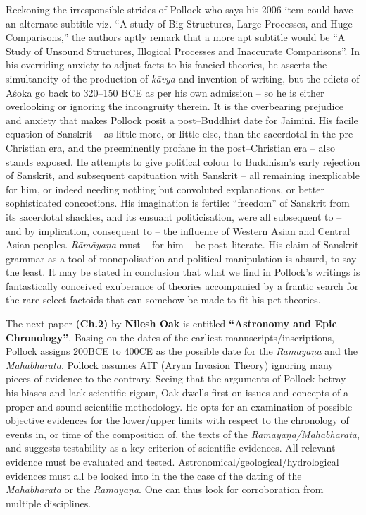 Reckoning the irresponsible strides of Pollock who says his 2006 item could have an alternate subtitle viz. “A study of Big Structures, Large Processes, and Huge Comparisons,” the authors aptly remark that a more apt subtitle would be “\underline{A Study of Unsound Structures, Illogical Processes and Inaccurate Comparisons}”. In his overriding anxiety to adjust facts to his fancied theories, he asserts the simultaneity of the production of \textit{kāvya} and invention of writing, but the edicts of Aśoka go back to 320–150 BCE as per his own admission – so he is either overlooking or ignoring the incongruity therein. It is the overbearing prejudice and anxiety that makes Pollock posit a post–Buddhist date for Jaimini. His facile equation of Sanskrit – as little more, or little else, than the sacerdotal in the pre–Christian era, and the preeminently profane in the post–Christian era – also stands exposed. He attempts to give political colour to Buddhism’s early rejection of Sanskrit, and subsequent capituation with Sanskrit – all remaining inexplicable for him, or indeed needing nothing but convoluted explanations, or better sophisticated concoctions. His imagination is fertile: “freedom” of Sanskrit from its sacerdotal shackles, and its ensuant politicisation, were all subsequent to – and by implication, consequent to – the influence of Western Asian and Central Asian peoples. \textit{Rāmāyaṇa} must – for him – be post–literate. His claim of Sanskrit grammar as a tool of monopolisation and political manipulation is absurd, to say the least. It may be stated in conclusion that what we find in Pollock’s writings is fantastically conceived exuberance of theories accompanied by a frantic search for the rare select factoids that can somehow be made to fit his pet theories.

The next paper \textbf{(Ch.2)} by \textbf{Nilesh Oak} is entitled \textbf{“Astronomy and Epic Chronology”}. Basing on the dates of the earliest manuscripts/inscriptions, Pollock assigns 200BCE to 400CE as the possible date for the \textit{Rāmāyaṇa} and the \textit{Mahābhārata}. Pollock assumes AIT (Aryan Invasion Theory) ignoring many pieces of evidence to the contrary. Seeing that the arguments of Pollock betray his biases and lack scientific rigour, Oak dwells first on issues and concepts of a proper and sound scientific methodology. He opts for an examination of possible objective evidences for the lower/upper limits with respect to the chronology of events in, or time of the composition of, the texts of the \textit{Rāmāyaṇa/Mahābhārata}, and suggests testability as a key criterion of scientific evidences. All relevant evidence must be evaluated and tested. Astronomical/geological/hydrological evidences must all be looked into in the the case of the dating of the \textit{Mahābhārata} or the \textit{Rāmāyaṇa}. One can thus look for corroboration from multiple disciplines.

